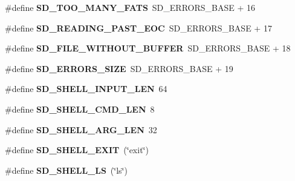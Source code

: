 \begin{DoxyCompactItemize}
\item 
\hypertarget{group__SD__Card_ga5017b3273c66c328264e9c4f565df36e}{\#define {\bfseries \-S\-D\-\_\-\-T\-O\-O\-\_\-\-M\-A\-N\-Y\-\_\-\-F\-A\-T\-S}~\-S\-D\-\_\-\-E\-R\-R\-O\-R\-S\-\_\-\-B\-A\-S\-E + 16}\label{group__SD__Card_ga5017b3273c66c328264e9c4f565df36e}

\item 
\hypertarget{group__SD__Card_ga9e554ff6dbb9ada7d94a896533f96796}{\#define {\bfseries \-S\-D\-\_\-\-R\-E\-A\-D\-I\-N\-G\-\_\-\-P\-A\-S\-T\-\_\-\-E\-O\-C}~\-S\-D\-\_\-\-E\-R\-R\-O\-R\-S\-\_\-\-B\-A\-S\-E + 17}\label{group__SD__Card_ga9e554ff6dbb9ada7d94a896533f96796}

\item 
\hypertarget{group__SD__Card_gad7281660fcc6b8fdfbc982fb2e261e8d}{\#define {\bfseries \-S\-D\-\_\-\-F\-I\-L\-E\-\_\-\-W\-I\-T\-H\-O\-U\-T\-\_\-\-B\-U\-F\-F\-E\-R}~\-S\-D\-\_\-\-E\-R\-R\-O\-R\-S\-\_\-\-B\-A\-S\-E + 18}\label{group__SD__Card_gad7281660fcc6b8fdfbc982fb2e261e8d}

\item 
\hypertarget{group__SD__Card_ga3cb8d9a3b08f02a70a48e891cc27e05b}{\#define {\bfseries \-S\-D\-\_\-\-E\-R\-R\-O\-R\-S\-\_\-\-S\-I\-Z\-E}~\-S\-D\-\_\-\-E\-R\-R\-O\-R\-S\-\_\-\-B\-A\-S\-E + 19}\label{group__SD__Card_ga3cb8d9a3b08f02a70a48e891cc27e05b}

\item 
\hypertarget{group__SD__Card_ga1fae78f046859f365629f8f0622cb6c1}{\#define {\bfseries \-S\-D\-\_\-\-S\-H\-E\-L\-L\-\_\-\-I\-N\-P\-U\-T\-\_\-\-L\-E\-N}~64}\label{group__SD__Card_ga1fae78f046859f365629f8f0622cb6c1}

\item 
\hypertarget{group__SD__Card_ga09e51228e75ddc9f72fc095a28050228}{\#define {\bfseries \-S\-D\-\_\-\-S\-H\-E\-L\-L\-\_\-\-C\-M\-D\-\_\-\-L\-E\-N}~8}\label{group__SD__Card_ga09e51228e75ddc9f72fc095a28050228}

\item 
\hypertarget{group__SD__Card_ga0aac3ed8f100622099f9d62c2a01a270}{\#define {\bfseries \-S\-D\-\_\-\-S\-H\-E\-L\-L\-\_\-\-A\-R\-G\-\_\-\-L\-E\-N}~32}\label{group__SD__Card_ga0aac3ed8f100622099f9d62c2a01a270}

\item 
\hypertarget{group__SD__Card_gafe17b4a90dc28817a4ec21ec3c570ef5}{\#define {\bfseries \-S\-D\-\_\-\-S\-H\-E\-L\-L\-\_\-\-E\-X\-I\-T}~(\char`\"{}exit\char`\"{})}\label{group__SD__Card_gafe17b4a90dc28817a4ec21ec3c570ef5}

\item 
\hypertarget{group__SD__Card_ga22406808e8ee8a624cdc5907460b3116}{\#define {\bfseries \-S\-D\-\_\-\-S\-H\-E\-L\-L\-\_\-\-L\-S}~(\char`\"{}ls\char`\"{})}\label{group__SD__Card_ga22406808e8ee8a624cdc5907460b3116}


\end{DoxyCompactItemize}
